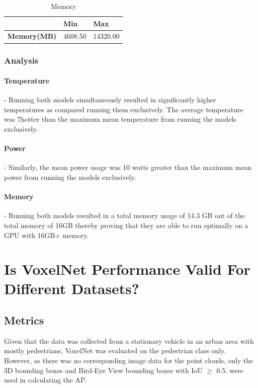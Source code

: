 \begin{table}[H] %
	\centering
	\caption{Memory}
	\label{tab:mem}
	\begin{tabular}{|l|l|l|}
		\hline
		& \textbf{Min} & \textbf{Max} \\ \hline
		\textbf{Memory(MB)} & 4608.50  & 14320.00\\ \hline
	\end{tabular}
	
\end{table}


\subsubsection*{Analysis}

\paragraph{Temperature} - Running both models simultaneously resulted in significantly higher temperatures as compared running them exclusively. The average temperature was 7\degree hotter than the maximum mean temperature from running the models exclusively. 
\paragraph{Power} - Similarly, the mean power usage was 10 watts greater than  the maximum mean power from running the models exclusively. 
\paragraph{Memory} - Running both models resulted in a total memory usage of 14.3 GB out of the total memory of 16GB thereby proving that they are able to run optimally on a GPU with 16GB+ memory.  


\section{Is VoxelNet Performance Valid For Different Datasets?}
\subsection*{Metrics}
Given that the data was collected from a stationary vehicle in an urban area with mostly pedestrians,  VoxelNet was evaluated on the pedestrian class only. However, as there was no corresponding image data for the point clouds, only the 3D bounding boxes and Bird-Eye View bounding boxes with IoU $\geq$ 0.5. were used in calculating the AP. 
